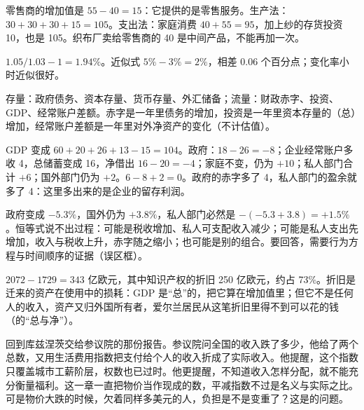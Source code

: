 \begin{answers}
\item 零售商的增加值是 $55-40=15$：它提供的是零售服务。生产法：$30+30+30+15=105$。支出法：家庭消费 $40+55=95$，加上纱的存货投资 10，也是 105。织布厂卖给零售商的 40 是中间产品，不能再加一次。
\item $1.05/1.03-1=1.94\%$。近似式 $5\%-3\%=2\%$，相差 0.06 个百分点；变化率小时近似很好。
\item 存量：政府债务、资本存量、货币存量、外汇储备；流量：财政赤字、投资、GDP、经常账户差额。赤字是一年里债务的增加，投资是一年里资本存量的（总）增加，经常账户差额是一年里对外净资产的变化（不计估值）。
\item GDP 变成 $60+20+26+13-15=104$。政府：$18-26=-8$；企业经常账户多收 4，总储蓄变成 16，净借出 $16-20=-4$；家庭不变，仍为 $+10$；私人部门合计 $+6$；国外部门仍为 $+2$。$6-8+2=0$。政府的赤字多了 4，私人部门的盈余就多了 4：这里多出来的是企业的留存利润。
\item 政府变成 $-5.3\%$，国外仍为 $+3.8\%$，私人部门必然是 $-(-5.3+3.8)=+1.5\%$。恒等式说不出过程：可能是税收增加、私人可支配收入减少；可能是私人支出先增加，收入与税收上升，赤字随之缩小；也可能是别的组合。要回答，需要行为方程与时间顺序的证据（误区框）。
\item $2072-1729=343$ 亿欧元，其中知识产权的折旧 250 亿欧元，约占 73\%。折旧是迁来的资产在使用中的损耗：GDP 是“总”的，把它算在增加值里；但它不是任何人的收入，资产又归外国所有者，爱尔兰居民从这笔折旧里得不到可以花的钱（的“总与净”）。
\end{answers}

回到库兹涅茨交给参议院的那份报告。参议院问全国的收入跌了多少，他给了两个总数，又用生活费用指数把支付给个人的收入折成了实际收入。他提醒，这个指数只覆盖城市工薪阶层，权数也已过时。他更提醒，不知道收入怎样分配，就不能充分衡量福利。这一章一直把物价当作现成的数，平减指数不过是名义与实际之比。可是物价大跌的时候，欠着同样多美元的人，负担是不是变重了？这是的问题。
